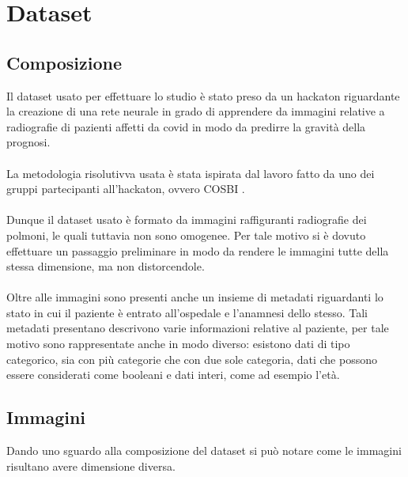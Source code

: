 \chapter{Dataset}
\label{ch:Dataset}
\section{Composizione}
Il dataset usato per effettuare lo studio è stato preso da un hackaton \cite{ai} riguardante la creazione di una rete neurale in grado di apprendere 
da immagini relative a radiografie di pazienti affetti da covid in modo da predirre la gravità della prognosi.
\\\\
La metodologia risolutivva usata è stata ispirata dal lavoro fatto da uno dei gruppi partecipanti all'hackaton, ovvero COSBI \cite{cch}.
\\\\
Dunque il dataset usato è formato da immagini raffiguranti radiografie dei polmoni, le quali tuttavia non sono omogenee. Per tale motivo 
si è dovuto effettuare un passaggio preliminare in modo da rendere le immagini tutte della stessa dimensione, ma non distorcendole.
\\\\
Oltre alle immagini sono presenti anche un insieme di metadati riguardanti lo stato in cui il paziente è entrato all'ospedale e l'anamnesi dello stesso.
Tali metadati presentano descrivono varie informazioni relative al paziente, per tale motivo sono rappresentate anche in modo diverso: esistono dati di tipo categorico, sia con più categorie che con
due sole categoria, dati che possono essere considerati come booleani e dati interi, come ad esempio l'età.
\clearpage
\section{Immagini}
Dando uno sguardo alla composizione del dataset si può notare come le immagini risultano avere dimensione diversa.

